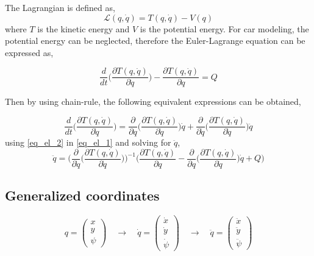 \documentclass[12pt]{article}
\begin{document}
The Lagrangian is defined as,
\begin{equation}
\mathcal{L} (q,\dot{q}) = T(q,\dot{q}) - V(q)    
\end{equation}
where $T$ is the kinetic energy and $V$ is the potential energy. For car modeling, the potential energy can be neglected, therefore the Euler-Lagrange equation can be expressed as,

\begin{equation} \label{eq_el_1}
    \frac{d}{dt} \Big( \frac{\partial T(q,\dot{q}) }{\partial \dot{q}} \Big) - \frac{\partial T(q,\dot{q}) }{\partial q} = Q
\end{equation}

Then by using chain-rule, the following equivalent expressions can be obtained,

\begin{equation} \label{eq_el_2}
  \frac{d}{dt} \Big( \frac{\partial T(q,\dot{q}) }{\partial \dot{q}} \Big) = \frac{\partial }{\partial q} \Big( \frac{\partial T(q,\dot{q})}{\partial \dot{q}} \Big) \dot{q} + \frac{\partial }{\partial \dot{q}} \Big( \frac{\partial T(q,\dot{q})}{\partial \dot{q}} \Big) \ddot{q}  
\end{equation}
using \eqref{eq_el_2} in \eqref{eq_el_1} and solving for $\ddot{q}$,
\begin{equation}
    \ddot{q} =  \Bigg(  \frac{\partial }{\partial \dot{q}} \Big( \frac{\partial T(q,\dot{q})}{\partial \dot{q}} \Big) \Bigg)^{-1} \Bigg( \frac{ \partial T(q,\dot{q})}{\partial q} - \frac{\partial }{\partial q} \Big( \frac{\partial T(q,\dot{q})}{\partial \dot{q}} \Big) \dot{q} + Q \Bigg)
\end{equation}
\subsection{Generalized coordinates}
\begin{equation} \label{Generalized_coordinates_eq}
    q = \begin{pmatrix} x \\ y \\ \psi \end{pmatrix} \quad \longrightarrow \quad \dot{q} = \begin{pmatrix} \dot{x} \\ \dot{y} \\ \dot{\psi} \end{pmatrix} \quad \longrightarrow \quad \ddot{q} = \begin{pmatrix} \ddot{x} \\ \ddot{y} \\ \ddot{\psi} \end{pmatrix}
\end{equation}
\end{document}
